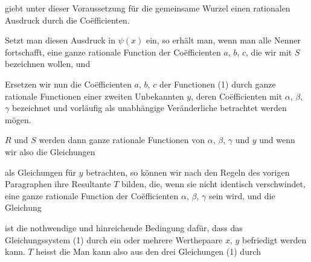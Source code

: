 giebt unter dieser Voraussetzung für die gemeinsame Wurzel
einen rationalen Ausdruck durch die Coëfficienten.

Setzt man diesen Ausdruck in $\psi(x)$ ein, so erhält man,
wenn man alle Nenner fortschafft, eine ganze rationale Function
der Coëfficienten $a$, $b$, $c$, die wir mit $S$ bezeichnen wollen, und

Ersetzen wir nun die Coëfficienten $a$, $b$, $c$ der Functionen
(1) durch ganze rationale Functionen einer zweiten Unbekannten
$y$, deren Coëfficienten mit $\alpha$, $\beta$, $\gamma$ bezeichnet und vorläufig als
unabhängige Veränderliche betrachtet werden mögen.

$R$ und $S$ werden dann ganze rationale Functionen von
$\alpha$, $\beta$, $\gamma$ und $y$ und wenn wir also die Gleichungen


als Gleichungen für $y$ betrachten, so können wir nach den
Regeln des vorigen Paragraphen ihre Resultante $T$ bilden, die,
wenn sie nicht identisch verschwindet, eine ganze rationale
Function der Coëfficienten $\alpha$, $\beta$, $\gamma$ sein wird, und die Gleichung


ist die nothwendige und hinreichende Bedingung dafür, dass das
Gleichungssystem (1) durch ein oder mehrere Werthepaare $x$, $y$
befriedigt werden kann. $T$ heisst die  %
Man kann also aus den drei Gleichungen (1) durch 

